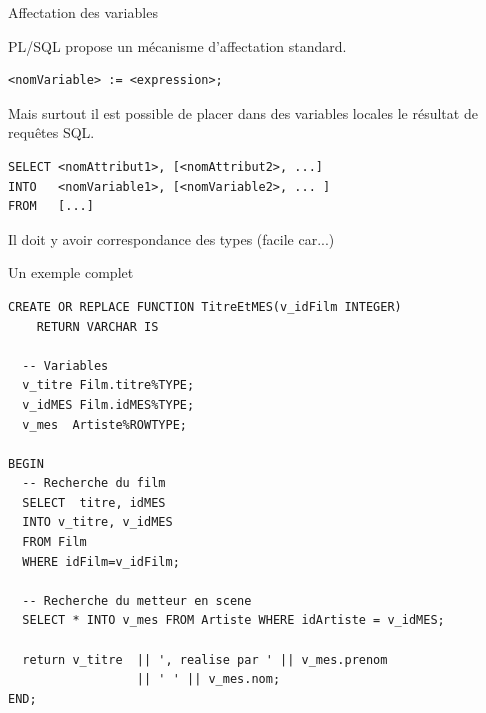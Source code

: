 \begin{frame}[fragile]{Affectation des variables}

PL/SQL propose un mécanisme d'affectation standard.

\vfill

\begin{scriptsize}
\begin{verbatim}
<nomVariable> := <expression>;
\end{verbatim}
\end{scriptsize}

\vfill

Mais surtout il est possible de placer dans des variables locales le résultat de requêtes SQL.


\begin{scriptsize}
\begin{verbatim}
SELECT <nomAttribut1>, [<nomAttribut2>, ...]
INTO   <nomVariable1>, [<nomVariable2>, ... ]
FROM   [...]
\end{verbatim}
\end{scriptsize}

\vfill

Il doit y avoir correspondance des types (facile car...)
\end{frame}


\begin{frame}[fragile]{Un exemple complet}

\begin{scriptsize}
\begin{verbatim}
CREATE OR REPLACE FUNCTION TitreEtMES(v_idFilm INTEGER) 
    RETURN VARCHAR IS

  -- Variables
  v_titre Film.titre%TYPE;
  v_idMES Film.idMES%TYPE;
  v_mes  Artiste%ROWTYPE;

BEGIN
  -- Recherche du film
  SELECT  titre, idMES
  INTO v_titre, v_idMES
  FROM Film
  WHERE idFilm=v_idFilm;

  -- Recherche du metteur en scene
  SELECT * INTO v_mes FROM Artiste WHERE idArtiste = v_idMES;

  return v_titre  || ', realise par ' || v_mes.prenom
                  || ' ' || v_mes.nom;
END;
\end{verbatim}
\end{scriptsize}

\end{frame}


